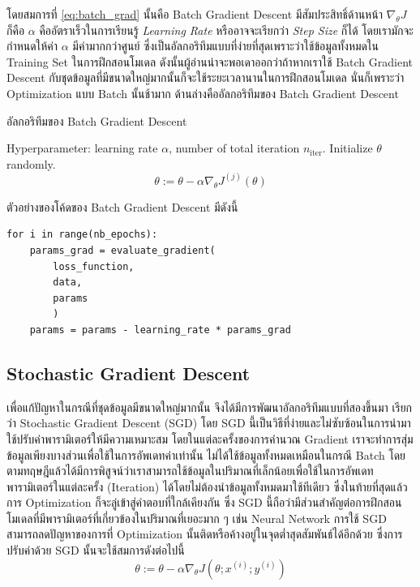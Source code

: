 \noindent โดยสมการที่ \eqref{eq:batch_grad} นั้นคือ Batch Gradient Descent มีสัมประสิทธิ์ด้านหน้า $\nabla_\theta J$ ก็คือ $\alpha$ คืออัตราเร็วในการเรียนรู้ \textit{Learning Rate} หรืออาจจะเรียกว่า \textit{Step Size} ก็ได้ โดยเรามักจะกำหนดให้ค่า $\alpha$ มีค่ามากกว่าศูนย์ ซึ่งเป็นอัลกอริทึมแบบที่ง่ายที่สุดเพราะว่าใช้ข้อมูลทั้งหมดใน Training Set ในการฝึกสอนโมเดล ดังนั้นผู้อ่านน่าจะพอเดาออกว่าถ้าหากเราใช้ Batch Gradient Descent กับชุดข้อมูลที่มีขนาดใหญ่มากนั้นก็จะใช้ระยะเวลานานในการฝึกสอนโมเดล นั่นก็เพราะว่า Optimization แบบ Batch นั้นช้ามาก ด้านล่างคืออัลกอริทึมของ Batch Gradient Descent

\begin{algorithm}[H]
    \caption{อัลกอริทึมของ Batch Gradient Descent}
    \label{alg:batch_grad}
    \begin{algorithmic}
        \State Hyperparameter: learning rate $\alpha$, number of total iteration $n_\text{iter}$.
        \State Initialize $\theta$ randomly.
        \begin{equation*}
            \theta := \theta - \alpha\nabla_\theta J^{(j)}(\theta)
        \end{equation*}
        \EndFor
    \end{algorithmic}
\end{algorithm}

\noindent ตัวอย่างของโค้ดของ Batch Gradient Descent มีดังนี้

\begin{lstlisting}[style=MyPython]
for i in range(nb_epochs):
    params_grad = evaluate_gradient(
        loss_function, 
        data, 
        params
        )
    params = params - learning_rate * params_grad
\end{lstlisting}

\subsection{Stochastic Gradient Descent}
\label{ssec:stochastic_grad}

เพื่อแก้ปัญหาในกรณีที่ชุดข้อมูลมีขนาดใหญ่มากนั้น จึงได้มีการพัฒนาอัลกอริทึมแบบที่สองขึ้นมา เรียกว่า Stochastic Gradient Descent (SGD) โดย SGD นี้เป็นวิธีที่ง่ายและไม่ซับซ้อนในการนำมาใช้ปรับค่าพารามิเตอร์ให้มีความเหมาะสม โดยในแต่ละครั้งของการคำนวณ Gradient เราจะทำการสุ่มข้อมูลเพียงบางส่วนเพื่อใช้ในการอัพเดทค่าเท่านั้น ไม่ได้ใช้ข้อมูลทั้งหมดเหมือนในกรณี Batch โดยตามทฤษฎีแล้วได้มีการพิสูจน์ว่าเราสามารถใช้ข้อมูลในปริมาณที่เล็กน้อยเพื่อใช้ในการอัพเดทพารามิเตอร์ในแต่ละครั้ง (Iteration) ได้โดยไม่ต้องนำข้อมูลทั้งหมดมาใช้ทีเดียว ซึ่งในท้ายที่สุดแล้วการ Optimization ก็จะลู่เข้าสู่คำตอบที่ใกล้เคียงกัน ซึ่ง SGD นี้ถือว่ามีส่วนสำคัญต่อการฝึกสอนโมเดลที่มีพารามิเตอร์ที่เกี่ยวข้องในปริมาณที่เยอะมาก ๆ เช่น Neural Network การใช้ SGD สามารถลดปัญหาของการที่ Optimization นั้นติดหรือค้างอยู่ในจุดต่ำสุดสัมพันธ์ได้อีกด้วย ซึ่งการปรับค่าด้วย SGD นั้นจะใช้สมการดังต่อไปนี้
%
\begin{equation}\label{eq:sgd}
    \theta := \theta - \alpha\nabla_\theta J( \theta; x^{(i)}; y^{(i)})
\end{equation}

